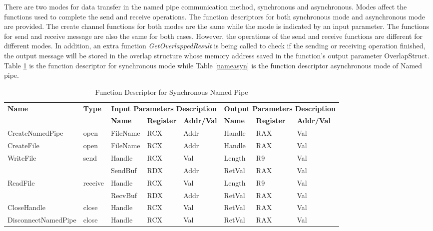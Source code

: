 There are two modes for data transfer in the named pipe communication method, synchronous and asynchronous. Modes affect the functions used to complete the send and receive operations. The function descriptors for both synchronous mode and asynchronous mode are provided. The create channel functions for both modes are the same while the mode is indicated by an input parameter. The functions for send and receive message are also the same for both cases. However, the operations of the send and receive functions are different for different modes. In addition, an extra function \textit{GetOverlappedResult} is being called to check if the sending or receiving operation finished, the output message will be stored in the overlap structure whose memory address saved in the function's output parameter OverlapStruct. Table \ref{namesyn} is the function descriptor for synchronous mode while Table \ref{nameasyn} is the function descriptor asynchronous mode of Named pipe.

\begin{table}[H]
  \centering
  \caption{Function Descriptor for Synchronous Named Pipe}
  \label{namesyn}
  \begin{tabular}{|l|l|l|l|l|l|l|l|}
\hline
             \multirow{2}{*}{{\textbf{Name}}} & \multirow{2}{*}{{\textbf{Type}}} & \multicolumn{3}{c|}{\textbf{Input Parameters Description}} & \multicolumn{3}{c|}{\textbf{Output Parameters Description}} \\
              \cline{3-8} 
             & & \textbf{Name}& \textbf{Register} & \textbf{Addr/Val} & \textbf{Name}& \textbf{Register} &  \textbf{Addr/Val}  \\
             \hline
      CreateNamedPipe
       &open & FileName & RCX  & Addr &  Handle & RAX & Val\\
      \hline         
      CreateFile
       &open & FileName & RCX & Addr&  Handle & RAX & Val\\ 
      \hline              
      \multirow{2}{*}{WriteFile}
       &\multirow{2}{*}{send} &  Handle & RCX & Val & Length & R9 &Val\\
        \cline{3-8} 
       & & SendBuf & RDX & Addr & RetVal& RAX & Val\\
      \hline            
      \multirow{2}{*}{ReadFile}
       &\multirow{2}{*}{receive} &  Handle & RCX & Val& Length &R9 & Val\\
        \cline{3-8} 
       & & RecvBuf & RDX  & Addr & RetVal& RAX & Val\\
      \hline            
      CloseHandle &
       close &  Handle & RCX & Val & RetVal& RAX & Val\\
      \hline            
      DisconnectNamedPipe &
      close &  Handle & RCX & Val & RetVal& RAX & Val\\
      \hline               
  \end{tabular}
\end{table}

